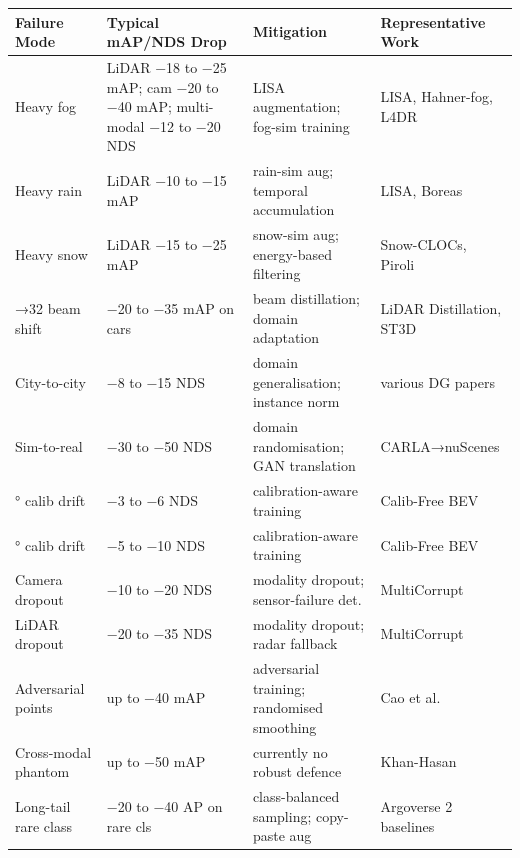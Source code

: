 {\def\LTcaptype{none} %
\begin{longtable}[]{@{}
  >{\raggedright\arraybackslash}p{}
  >{\raggedright\arraybackslash}p{}
  >{\raggedright\arraybackslash}p{}
  >{\raggedright\arraybackslash}p{}@{}}
\toprule\noalign{}
\begin{minipage}[b]{\linewidth}\raggedright
Failure Mode
\end{minipage} & \begin{minipage}[b]{\linewidth}\raggedright
Typical mAP/NDS Drop
\end{minipage} & \begin{minipage}[b]{\linewidth}\raggedright
Mitigation
\end{minipage} & \begin{minipage}[b]{\linewidth}\raggedright
Representative Work
\end{minipage} \\
\midrule\noalign{}
\endhead
\bottomrule\noalign{}
\endlastfoot
Heavy fog & LiDAR −18 to −25 mAP; cam −20 to −40 mAP; multi-modal −12 to −20 NDS & LISA augmentation; fog-sim training & LISA, Hahner-fog, L4DR \\
Heavy rain & LiDAR −10 to −15 mAP & rain-sim aug; temporal accumulation & LISA, Boreas \\
Heavy snow & LiDAR −15 to −25 mAP & snow-sim aug; energy-based filtering & Snow-CLOCs, Piroli \\
64→32 beam shift & −20 to −35 mAP on cars & beam distillation; domain adaptation & LiDAR Distillation, ST3D \\
City-to-city & −8 to −15 NDS & domain generalisation; instance norm & various DG papers \\
Sim-to-real & −30 to −50 NDS & domain randomisation; GAN translation & CARLA→nuScenes \\
0.5° calib drift & −3 to −6 NDS & calibration-aware training & Calib-Free BEV \\
1.0° calib drift & −5 to −10 NDS & calibration-aware training & Calib-Free BEV \\
Camera dropout & −10 to −20 NDS & modality dropout; sensor-failure det. & MultiCorrupt \\
LiDAR dropout & −20 to −35 NDS & modality dropout; radar fallback & MultiCorrupt \\
Adversarial points & up to −40 mAP & adversarial training; randomised smoothing & Cao et al. \\
Cross-modal phantom & up to −50 mAP & currently no robust defence & Khan-Hasan \\
Long-tail rare class & −20 to −40 AP on rare cls & class-balanced sampling; copy-paste aug & Argoverse 2 baselines \\
\end{longtable}
}

